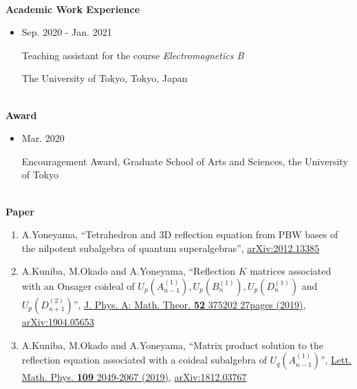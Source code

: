 \documentclass[dvipdfmx]{jsarticle}
\begin{document}
%
%
%
%
{\ }\\
\vspace{3mm}
{\bf\large Academic Work Experience}
\vspace{-6mm}
\\\hrulefill
\begin{itemize}
\item
Sep. 2020 - Jan. 2021
\par
Teaching assistant for the course \textit{Electromagnetics B}
\par
The University of Tokyo, Tokyo, Japan
\end{itemize}
%
%
%
%
{\ }\\
\vspace{3mm}
{\bf\large Award}
\vspace{-6mm}
\\\hrulefill
\begin{itemize}
\item
Mar. 2020
\par
Encouragement Award, Graduate School of Arts and Sciences, the University of Tokyo
\end{itemize}
%
%
%
%
{\ }\\
\vspace{3mm}
{\bf\large Paper}
\vspace{-6mm}
\\\hrulefill
\begin{enumerate}
\renewcommand*\theenumi{\the\numexpr\value{paperCounter}-\value{enumi}}
\setcounter{paperCounter}{4}
\item
A.Yoneyama, ``Tetrahedron and 3D reflection equation from PBW bases of the nilpotent subalgebra of quantum superalgebras'', \href{https://arxiv.org/abs/2012.13385}{arXiv:2012.13385}
%
%
\item
A.Kuniba, M.Okado and A.Yoneyama, ``Reflection $K$ matrices associated with an Onsager coideal of $U_p(A_{n-1}^{(1)}),U_p(B_n^{(1)}),U_p(D_n^{(1)})$ and $U_p(D_{n+1}^{(2)})$'', \href{https://iopscience.iop.org/article/10.1088/1751-8121/ab3715}{J. Phys. A: Math. Theor. {\bf 52} 375202 27pages (2019)}, \href{https://arxiv.org/abs/1904.05653}{arXiv:1904.05653}
%
%
\item
A.Kuniba, M.Okado and A.Yoneyama, ``Matrix product solution to the reflection equation associated with a coideal subalgebra of $U_q(A_{n-1}^{(1)})$'', \href{http://links.springernature.com/f/a/VdNxbTDs8BDjk4rQBBmAjw~~/AABE5gA~/RgRekPU6P0QwaHR0cDovL3d3dy5zcHJpbmdlci5jb20vLS8wL0FXb09qTHhwT3VHTGE4WnNvSjRvVwNzcGNCCgAAusGvXDBnf-5SIHlvbmV5YW1hQGdva3V0YW4uYy51LXRva3lvLmFjLmpwWAQAAAbn}{Lett. Math. Phys. {\bf 109} 2049-2067 (2019)}, \href{https://arxiv.org/abs/1812.03767}{arXiv:1812.03767}
\end{enumerate}
\end{document}
